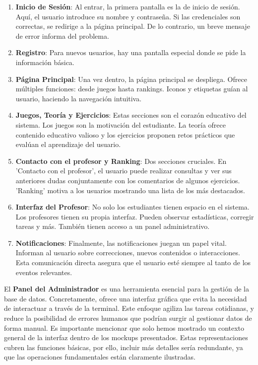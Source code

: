 \begin{enumerate}
    \item \textbf{Inicio de Sesión}: Al entrar, la primera pantalla es la de inicio de sesión. Aquí, el usuario introduce su nombre y contraseña. Si las credenciales son correctas, se redirige a la página principal. De lo contrario, un breve mensaje de error informa del problema.
    
    \item \textbf{Registro}: Para nuevos usuarios, hay una pantalla especial donde se pide la información básica.
    
    \item \textbf{Página Principal}: Una vez dentro, la página principal se despliega. Ofrece múltiples funciones: desde juegos hasta rankings. Iconos y etiquetas guían al usuario, haciendo la navegación intuitiva.
    
    \item \textbf{Juegos, Teoría y Ejercicios}: Estas secciones son el corazón educativo del sistema. Los juegos son la motivación del estudiante. La teoría ofrece contenido educativo valioso y los ejercicios proponen retos prácticos que evalúan el aprendizaje del usuario.
    
    \item \textbf{Contacto con el profesor y Ranking}: Dos secciones cruciales. En 'Contacto con el profesor', el usuario puede realizar consultas y ver sus anteriores dudas conjuntamente con los comentarios de algunos ejercicios. 'Ranking' motiva a los usuarios mostrando una lista de los más destacados.
    
    \item \textbf{Interfaz del Profesor}: No solo los estudiantes tienen espacio en el sistema. Los profesores tienen su propia interfaz. Pueden observar estadísticas, corregir tareas y más. También tienen acceso a un panel administrativo.
    
    \item \textbf{Notificaciones}: Finalmente, las notificaciones juegan un papel vital. Informan al usuario sobre correcciones, nuevos contenidos o interacciones. Esta comunicación directa asegura que el usuario esté siempre al tanto de los eventos relevantes.
\end{enumerate}

El \textbf{Panel del Administrador} es una herramienta esencial para la gestión de la base de datos. Concretamente, ofrece una interfaz gráfica que evita la necesidad de interactuar a través de la terminal. Este enfoque agiliza las tareas cotidianas, y reduce la posibilidad de errores humanos que podrían surgir al gestionar datos de forma manual. Es importante mencionar que solo hemos mostrado un contexto general de la interfaz dentro de los mockups presentados. Estas representaciones cubren las funciones básicas, por ello, incluir más detalles sería redundante, ya que las operaciones fundamentales están claramente ilustradas.

